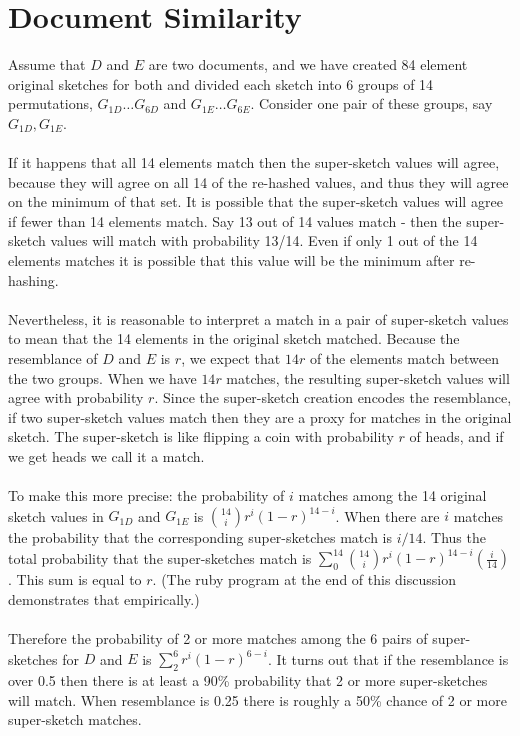 \documentclass[11pt]{article}
\begin{document}
\section{Document Similarity}
Assume that $D$ and $E$ are two documents, and we have created 84 element original sketches for both and divided each sketch into 6 groups of 14 permutations, $G_{1D} \dots G_{6D}$ and $G_{1E} \dots G_{6E}$. Consider one pair of these groups, say $G_{1D}, G_{1E}$. 
\\
\\
If it happens that all 14 elements match then the super-sketch values will agree, because they will agree on all 14 of the re-hashed values, and thus they will agree on the minimum of that set. It is possible that the super-sketch values will agree if fewer than 14 elements match. Say 13 out of 14 values match - then the super-sketch values will match with probability 13/14. Even if only 1 out of the 14 elements matches it is possible that this value will be the minimum after re-hashing.
\\
\\
Nevertheless, it is reasonable to interpret a match in a pair of super-sketch values to mean that the 14 elements in the original sketch matched. Because the resemblance of $D$ and $E$ is $r$, we expect that $14 r$ of the elements match between the two groups. When we have $14r$ matches, the resulting super-sketch values will agree with probability $r$. Since the super-sketch creation encodes the resemblance, if two super-sketch values match then they are a proxy for matches in the original sketch. The super-sketch is like flipping a coin with probability $r$ of heads, and if we get heads we call it a match.
\\
\\
To make this more precise: the probability of $i$ matches among the 14 original sketch values in $G_{1D}$ and $G_{1E}$ is $\binom{14}{i} r^i(1-r)^{14-i}$. When there are $i$ matches the probability that the corresponding super-sketches match is $i/14$. Thus the total probability that the super-sketches match is $\sum_0^{14} \binom{14}{i} r^i(1-r)^{14-i} \left ( \frac{i}{14} \right )$. This sum is equal to $r$. (The ruby program at the end of this discussion demonstrates that empirically.)
\\
\\
Therefore the probability of 2 or more matches among the 6 pairs of super-sketches for $D$ and $E$ is $\sum_2^{6} r^i(1-r)^{6-i}$. It turns out that if the resemblance is over 0.5 then there is at least a  90\% probability that 2 or more super-sketches will match. When resemblance is 0.25 there is roughly a 50\% chance of 2 or more super-sketch matches. \\
\end{document}
